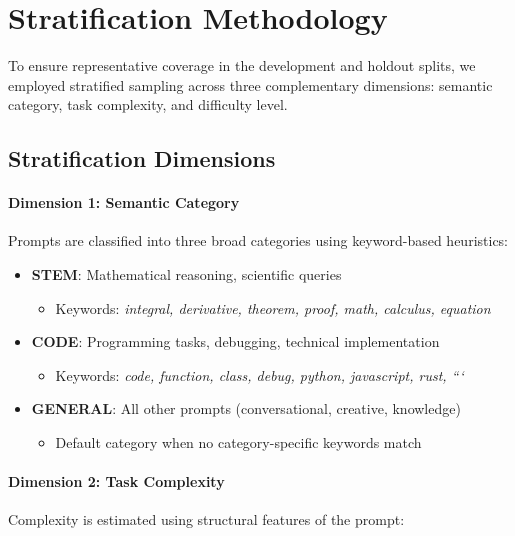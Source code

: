 \section{Stratification Methodology}
\label{app:stratification}

To ensure representative coverage in the development and holdout splits, we employed stratified sampling across three complementary dimensions: semantic category, task complexity, and difficulty level.

\subsection{Stratification Dimensions}

\paragraph{Dimension 1: Semantic Category}
Prompts are classified into three broad categories using keyword-based heuristics:

\begin{itemize}
    \item \textbf{STEM}: Mathematical reasoning, scientific queries
    \begin{itemize}
        \item Keywords: \textit{integral, derivative, theorem, proof, math, calculus, equation}
    \end{itemize}
    
    \item \textbf{CODE}: Programming tasks, debugging, technical implementation
    \begin{itemize}
        \item Keywords: \textit{code, function, class, debug, python, javascript, rust, ```}
    \end{itemize}
    
    \item \textbf{GENERAL}: All other prompts (conversational, creative, knowledge)
    \begin{itemize}
        \item Default category when no category-specific keywords match
    \end{itemize}
\end{itemize}

\paragraph{Dimension 2: Task Complexity}
Complexity is estimated using structural features of the prompt:

